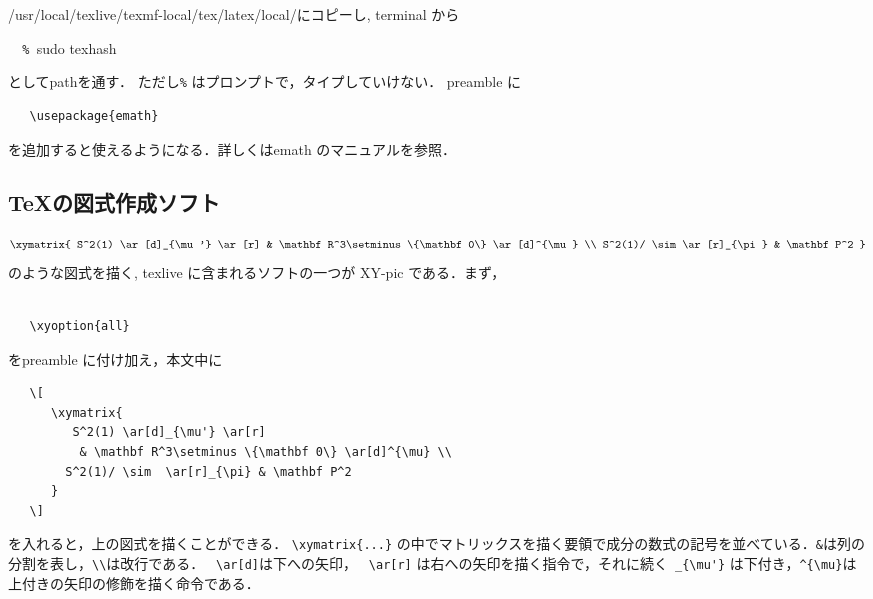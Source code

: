 \noindent
/usr/local/texlive/texmf-local/tex/latex/local/にコピーし, 
terminal から 

\verb/  % /sudo texhash

\noindent
としてpathを通す． ただし\verb/%/ はプロンプトで，タイプしていけない．
preamble に
\begin{verbatim}
   \usepackage{emath}
\end{verbatim}
を追加すると使えるようになる．詳しくはemath のマニュアルを参照．

\subsection{\TeX の図式作成ソフト}  
\[
   \xymatrix{
   S^2(1) \ar[d]_{\mu'} \ar[r]
    & \mathbf R^3\setminus \{\mathbf 0\} \ar[d]^{\mu} \\
   S^2(1)/ \sim  \ar[r]_{\pi} & \mathbf P^2 
   }
\]
のような図式を描く, texlive に含まれるソフトの一つが XY-pic である．まず，
\begin{verbatim}
   
   \xyoption{all}
\end{verbatim}
をpreamble に付け加え，本文中に
\begin{verbatim}
   \[
      \xymatrix{
         S^2(1) \ar[d]_{\mu'} \ar[r]
          & \mathbf R^3\setminus \{\mathbf 0\} \ar[d]^{\mu} \\
        S^2(1)/ \sim  \ar[r]_{\pi} & \mathbf P^2 
      }
   \]
\end{verbatim}
を入れると，上の図式を描くことができる．
\verb/\xymatrix{...}/ の中でマトリックスを描く要領で成分の数式の記号を並べている．\verb/&/は列の分割を表し，\verb/\\/は改行である．
\verb/ \ar[d]/は下への矢印，
\verb/ \ar[r]/ は右への矢印を描く指令で，それに続く\verb/ _{\mu'}/
は下付き，\verb/^{\mu}/は上付きの矢印の修飾を描く命令である．
   
   


